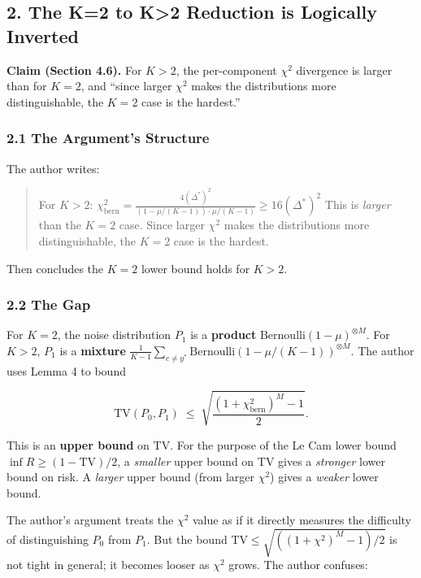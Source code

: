 \documentclass[
  12pt,
]{ctexart}
\begin{document}
\subsection{2. The K=2 to K\textgreater2 Reduction is Logically
Inverted}\label{the-k2-to-k2-reduction-is-logically-inverted}

\textbf{Claim (Section 4.6).} For \(K>2\), the per-component \(\chi^2\)
divergence is larger than for \(K=2\), and ``since larger \(\chi^2\)
makes the distributions more distinguishable, the \(K=2\) case is the
hardest.''

\subsubsection{2.1 The Argument's
Structure}\label{the-arguments-structure}

The author writes:

\begin{quote}
For \(K>2\):
\(\chi^2_{\text{bern}} = \frac{4(\Delta^*)^2}{(1-\mu/(K-1))\cdot \mu/(K-1)} \geq 16(\Delta^*)^2\)
This is \emph{larger} than the \(K=2\) case. Since larger \(\chi^2\)
makes the distributions more distinguishable, the \(K=2\) case is the
hardest.
\end{quote}

Then concludes the \(K=2\) lower bound holds for \(K>2\).

\subsubsection{2.2 The Gap}\label{the-gap}

For \(K=2\), the noise distribution \(P_1\) is a \textbf{product}
\(\text{Bernoulli}(1-\mu)^{\otimes M}\). For \(K>2\), \(P_1\) is a
\textbf{mixture}
\(\frac{1}{K-1}\sum_{c\neq y^*} \text{Bernoulli}(1-\mu/(K-1))^{\otimes M}\).
The author uses Lemma 4 to bound

\[\text{TV}(P_0, P_1) \;\leq\; \sqrt{\frac{(1+\chi^2_{\text{bern}})^M - 1}{2}}.\]

This is an \textbf{upper bound} on TV. For the purpose of the Le Cam
lower bound \(\inf R \geq (1 - \text{TV})/2\), a \emph{smaller} upper
bound on TV gives a \emph{stronger} lower bound on risk. A \emph{larger}
upper bound (from larger \(\chi^2\)) gives a \emph{weaker} lower bound.

The author's argument treats the \(\chi^2\) value as if it directly
measures the difficulty of distinguishing \(P_0\) from \(P_1\). But the
bound \(\text{TV} \leq \sqrt{((1+\chi^2)^M - 1)/2}\) is not tight in
general; it becomes looser as \(\chi^2\) grows. The author confuses:
\end{document}
